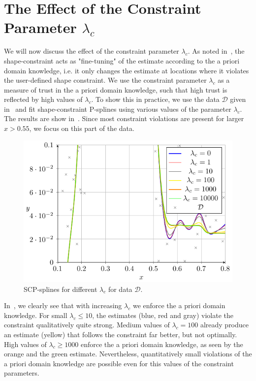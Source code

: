 \section{The Effect of the Constraint Parameter $\lambda_c$} \label{sec:lambda_c_sec}

We will now discuss the effect of the constraint parameter $\lambda_c$. As noted in~, the shape-constraint acts as "fine-tuning" of the estimate according to the a priori domain knowledge, i.e. it only changes the estimate at locations where it violates the user-defined shape constraint. We use the constraint parameter $\lambda_c$ as a measure of trust in the a priori domain knowledge, such that high trust is reflected by high values of $\lambda_c$. To show this in practice, we use the data $\mathcal{D}$ given in~ and fit shape-constraint P-splines using various values of the parameter $\lambda_c$. The results are show in~. Since most constraint violations are present for larger $x > 0.55$, we focus on this part of the data. 

\begin{figure}[H]
	\centering
	\includegraphics{graphics/pgfplots/cha4/exp-lambdas.pdf}
	\caption{SCP-splines for different $\lambda_c$ for data $\mathcal{D}$.}
	\label{fig:example-lambdas}
\end{figure}	

In~, we clearly see that with increasing $\lambda_c$ we enforce the a priori domain knowledge. For small $\lambda_c \le 10$, the estimates (blue, red and gray) violate the constraint qualitatively quite strong. Medium values of $\lambda_c = 100$ already produce an estimate (yellow) that follows the constraint far better, but not optimally. High values of $\lambda_c \ge 1000$ enforce the a priori domain knowledge, as seen by the orange and the green estimate. Nevertheless, quantitatively small violations of the a priori domain knowledge are possible even for this values of the constraint parameters. 

